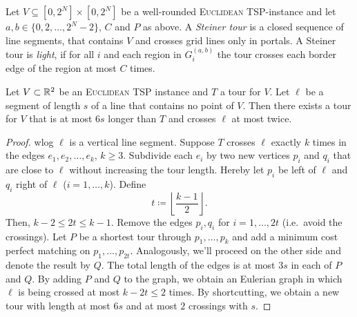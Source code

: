 \documentclass[../skript.tex]{subfiles}
\begin{document}
Let $V \subseteq [0, 2^N] \times [0, 2^N]$ be a well-rounded \textsc{Euclidean TSP}-instance and let $a, b \in \{ 0, 2, \ldots, 2^N - 2 \}$, $C$ and $P$ as above.
A \emph{Steiner tour} is a closed sequence of line segments, that contains $V$ and crosses grid lines only in portals. A Steiner tour is \emph{light}, if for all $i$ and each region in $G_i^{(a, b)}$ the tour crosses each border edge of the region at most $C$ times.
\begin{lemma} %
\label{thm:95}
Let $V \subset \mathbb{R}^2$ be an \textsc{Euclidean TSP} instance and $T$ a tour for $V$. Let $\ell$ be a segment of length $s$ of a line that contains no point of $V$. Then there exists a tour for $V$ that is at most $6s$ longer than $T$ and crosses $\ell$ at most twice.
\end{lemma}
\begin{proof}
\ac{wlog} $\ell$ is a vertical line segment. Suppose $T$ crosses $\ell$ exactly $k$ times in the edges $e_1, e_2, \ldots, e_k$, $k \geq 3$.
Subdivide each $e_i$ by two new vertices $p_i$ and $q_i$ that are close to $\ell$ without increasing the tour length. Hereby let $p_i$ be left of $\ell$ and $q_i$ right of $\ell$ ($i = 1, \ldots, k$).
Define
\[
	t \coloneqq \left\lfloor \frac{k-1}{2} \right\rfloor.
\]
Then, $k - 2 \leq 2 t \leq k - 1$.
Remove the edges $p_i, q_i$ for $i = 1, \ldots, 2t$ (i.e.\ avoid the crossings). Let $P$ be a shortest tour through $p_1, \ldots, p_k$ and add a minimum cost perfect matching on $p_1, \ldots, p_{2t}$. Analogously, we'll proceed on the other side and denote the result by $Q$.
The total length of the edges is at most $3s$ in each of $P$ and $Q$.
By adding $P$ and $Q$ to the graph, we obtain an Eulerian graph in which $\ell$ is being crossed at most $k - 2t \leq 2$ times. By shortcutting, we obtain a new tour with length at most $6s$ and at most $2$ crossings with $s$.
\end{proof}
\end{document}
